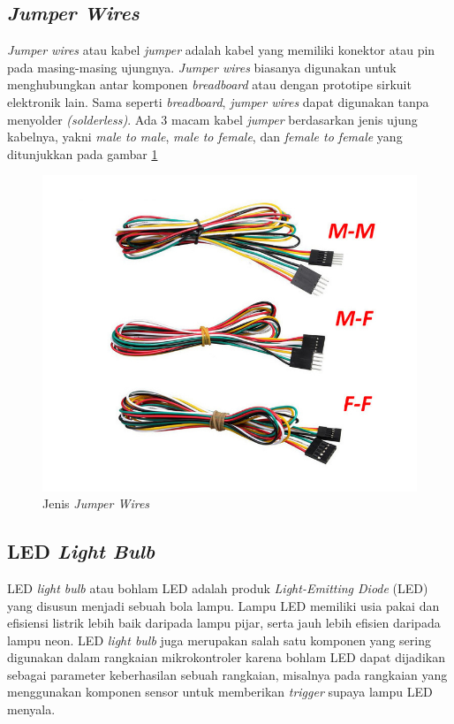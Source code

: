 \subsection{\textit{Jumper Wires}}
\tab \textit{Jumper wires} atau kabel \textit{jumper} adalah kabel yang memiliki konektor atau pin pada masing-masing ujungnya. \textit{Jumper wires} biasanya digunakan untuk menghubungkan antar komponen \textit{breadboard} atau dengan prototipe sirkuit elektronik lain. Sama seperti \textit{breadboard}, \textit{jumper wires} dapat digunakan tanpa menyolder \textit{(solderless)}. Ada 3 macam kabel \textit{jumper} berdasarkan jenis ujung kabelnya, yakni \textit{male to male}, \textit{male to female}, dan \textit{female to female} yang ditunjukkan pada gambar \ref{figure:jumperwires}

\begin{figure}[H]
	\centerline {
		\includegraphics[width=\linewidth]{bab3/img/jumperwires.png}
	}
	\caption{Jenis \textit{Jumper Wires}}
	\label{figure:jumperwires}
\end{figure}
 
\subsection{LED \textit{Light Bulb}}
\tab LED \textit{light bulb} atau bohlam LED adalah produk \textit{Light-Emitting Diode} (LED) yang disusun menjadi sebuah bola lampu. Lampu LED memiliki usia pakai dan efisiensi listrik lebih baik daripada lampu pijar, serta jauh lebih efisien daripada lampu neon. LED \textit{light bulb} juga merupakan salah satu komponen yang sering digunakan dalam rangkaian mikrokontroler karena bohlam LED dapat dijadikan sebagai parameter keberhasilan sebuah rangkaian, misalnya pada rangkaian yang menggunakan komponen sensor untuk memberikan \textit{trigger} supaya lampu LED menyala.

